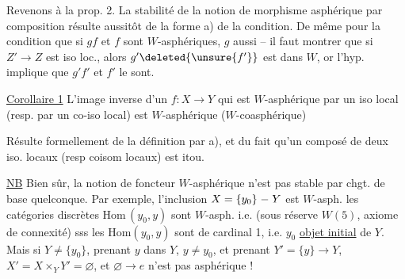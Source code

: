 
Revenons à la prop. 2. La stabilité de la notion de morphisme asphérique par composition  résulte aussitôt de la forme a) de la condition. De même pour la condition que si $gf$ et $f$ sont $W$-asphériques, $g$ aussi -- il faut montrer que si $Z'\longrightarrow Z$ est iso loc., alors $g'\deleted{\unsure{f'}}$ est dans $W$, or l'hyp. implique que $g'f'$ et $f'$ le sont.

 \uline{Corollaire 1} L'image inverse d'un $f:X\longrightarrow Y$ qui est $W$-asphérique  par un iso local (resp. par un co-iso local) est $W$-asphérique ($W$-coasphérique)

 Résulte formellement de la définition par a), et du fait qu'un composé de deux iso. locaux (resp coisom locaux) est itou.

\uline{NB} Bien sûr, la notion de foncteur $W$-asphérique n'est pas stable par chgt. de base quelconque.  Par exemple, l'inclusion $X=\{y_0\}\mathrel{\relbar}Y$ est $W$-asph.  les catégories discrètes $\mathrm{Hom}\,(y_0,y)$ sont $W$-asph. i.e. (sous réserve  $W(5)$, axiome de connexité) sss les $\mathrm{Hom}(y_0,y)$ sont de cardinal 1, i.e. $y_0$ \uline{objet initial} de $Y$. Mais si $Y\ne\{y_0\}$, prenant $y$ dans $Y$, $y\ne y_0$,  et prenant $Y'=\{y\}\longrightarrow Y$,  $X'=X\times_Y Y'=\varnothing$, et $\varnothing\longrightarrow e$ n'est pas asphérique !


